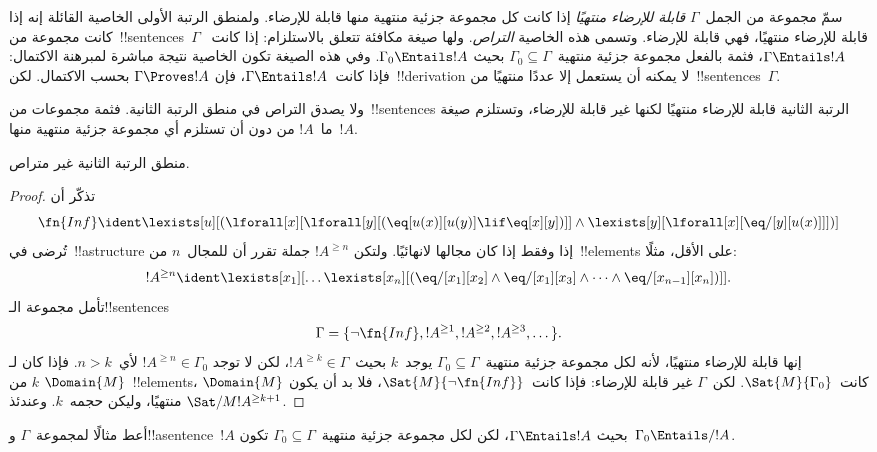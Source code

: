 \documentclass[../../../include/open-logic-section]{subfiles}
\begin{document}


\begin{explain}
سمّ مجموعة من الجمل~$\Gamma$ \emph{قابلة للإرضاء منتهيًا} إذا كانت كل
مجموعة جزئية منتهية منها قابلة للإرضاء. ولمنطق الرتبة الأولى الخاصية
القائلة إنه إذا كانت مجموعة من~!!{sentence}s~$\Gamma$ قابلة للإرضاء
منتهيًا، فهي قابلة للإرضاء. وتسمى هذه الخاصية \emph{التراص}. ولها صيغة
مكافئة تتعلق بالاستلزام: إذا كانت~$\Gamma \Entails !A$، فثمة بالفعل
مجموعة جزئية منتهية~$\Gamma_0 \subseteq \Gamma$ بحيث
$\Gamma_0 \Entails !A$. وفي هذه الصيغة تكون الخاصية نتيجة مباشرة
لمبرهنة الاكتمال: فإذا كانت~$\Gamma \Entails !A$، فإن
$\Gamma \Proves !A$ بحسب الاكتمال. لكن~!!{derivation} لا يمكنه أن
يستعمل إلا عددًا منتهيًا من~!!{sentence}s~$\Gamma$.

ولا يصدق التراص في منطق الرتبة الثانية. فثمة مجموعات من~!!{sentence}s
الرتبة الثانية قابلة للإرضاء منتهيًا لكنها غير قابلة للإرضاء، وتستلزم
صيغة ما~$!A$ من دون أن تستلزم أي مجموعة جزئية منتهية منها~$!A$.
\end{explain}

\begin{thm}
منطق الرتبة الثانية غير متراص.
\end{thm}

\begin{proof}
تذكّر أن
\[
\fn{Inf} \ident \lexists[u][(\lforall[x][\lforall[y][(\eq[u(x)][u(y)]
      \lif \eq[x][y])]] \land \lexists[y][\lforall[x][\eq/[y][u(x)]]])]
\]
تُرضى في~!!a{structure} إذا وفقط إذا كان مجالها لانهائيًا. ولتكن
$!A^{\ge n}$ جملة تقرر أن للمجال~$n$ من~!!{element}s على الأقل، مثلًا:
\[
!A^{\ge n} \ident \lexists[x_1][\dots\lexists[x_n][(\eq/[x_1][x_2]
    \land \eq/[x_1][x_3] \land \dots \land \eq/[x_{n-1}][x_n])]].
\]
تأمل مجموعة الـ!!{sentence}s
\[
\Gamma = \{\lnot \fn{Inf}, !A^{\ge 1}, !A^{\ge 2}, !A^{\ge 3}, \dots\}.
\]
إنها قابلة للإرضاء منتهيًا، لأنه لكل مجموعة جزئية منتهية~$\Gamma_0
\subseteq \Gamma$ يوجد~$k$ بحيث~$!A^{\ge k} \in \Gamma$، لكن لا توجد
$!A^{\ge n} \in \Gamma_0$ لأي~$n>k$. فإذا كان لـ$\Domain{M}$
$k$ من~!!{element}s، كانت~$\Sat{M}{\Gamma_0}$. لكن~$\Gamma$ غير
قابلة للإرضاء: فإذا كانت~$\Sat{M}{\lnot \fn{Inf}}$، فلا بد أن يكون
$\Domain{M}$ منتهيًا، وليكن حجمه~$k$. وعندئذ
$\Sat/{M}{!A^{\ge k+1}}$.
\end{proof}

\begin{prob}
أعط مثالًا لمجموعة~$\Gamma$ و!!a{sentence}~$!A$ بحيث
$\Gamma \Entails !A$، لكن لكل مجموعة جزئية منتهية~$\Gamma_0 \subseteq
\Gamma$ تكون~$\Gamma_0 \Entails/ !A$.
\end{prob}
\end{document}

